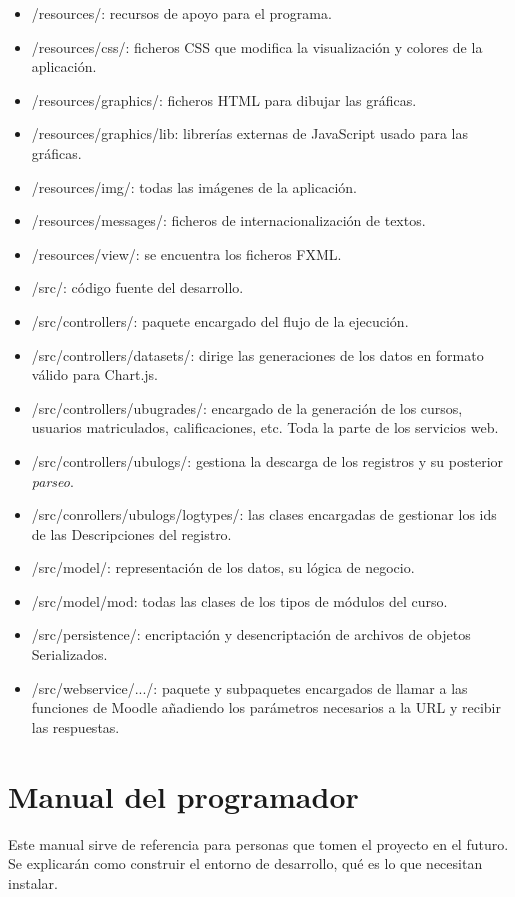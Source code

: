 \begin{itemize}
	\item /resources/: recursos de apoyo para el programa.
	\item /resources/css/: ficheros CSS que modifica la visualización y colores de la aplicación.
	\item /resources/graphics/: ficheros HTML para dibujar las gráficas.
	\item /resources/graphics/lib: librerías externas de JavaScript usado para las gráficas.
	\item /resources/img/: todas las imágenes de la aplicación.
	\item /resources/messages/: ficheros de internacionalización de textos.
	\item /resources/view/: se encuentra los ficheros FXML.
	\item /src/: código fuente del desarrollo.
	\item /src/controllers/: paquete encargado del flujo de la ejecución.
	\item /src/controllers/datasets/: dirige las generaciones de los datos en formato válido para Chart.js.
	\item /src/controllers/ubugrades/: encargado de la generación de los cursos, usuarios matriculados, calificaciones, etc. Toda la parte de los servicios web.
	\item /src/controllers/ubulogs/: gestiona la descarga de los registros y su posterior \textit{parseo}.
	\item /src/conrollers/ubulogs/logtypes/: las clases encargadas de gestionar los ids de las Descripciones del registro.
	\item /src/model/: representación de los datos, su lógica de negocio.
	\item /src/model/mod: todas las clases de los tipos de módulos del curso.
	\item /src/persistence/: encriptación y desencriptación de archivos de objetos Serializados.
	\item /src/webservice/.../: paquete y subpaquetes encargados de llamar a las funciones de Moodle añadiendo los parámetros necesarios a la URL y recibir las respuestas.
	

\end{itemize}

\section{Manual del programador} \label{sec:manual_programdor}

Este manual sirve de referencia para personas que tomen el proyecto en el futuro. Se explicarán como construir el entorno de desarrollo, qué es lo que necesitan instalar.

